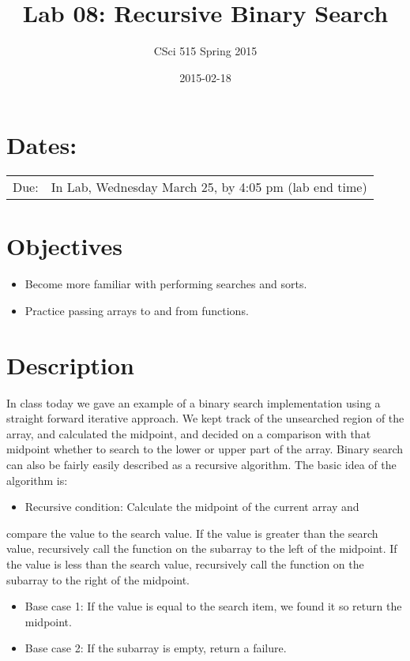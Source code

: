 \documentclass[11pt]{article}
\title{Lab 08: Recursive Binary Search}
\author{CSci 515 Spring 2015}
\date{2015-02-18}
\begin{document}
\maketitle


\section*{Dates:}
\label{sec-1}


\begin{center}
\begin{tabular}{ll}
 Due:  &  In Lab, Wednesday March 25, by 4:05 pm (lab end time)  \\
\end{tabular}
\end{center}
\section*{Objectives}
\label{sec-2}

\begin{itemize}
\item Become more familiar with performing searches and sorts.
\item Practice passing arrays to and from functions.
\end{itemize}
\section*{Description}
\label{sec-3}

In class today we gave an example of a binary search implementation
using a straight forward iterative approach.  We kept track of the
unsearched region of the array, and calculated the midpoint, and
decided on a comparison with that midpoint whether to search to the
lower or upper part of the array.  Binary search can also be fairly
easily described as a recursive algorithm.  The basic idea of the
algorithm is:

\begin{itemize}
\item Recursive condition: Calculate the midpoint of the current array and
\end{itemize}
compare the value to the search value.  If the value is greater than
the search value, recursively call the function on the subarray
to the left of the midpoint.  If the value is less than the search
value, recursively call the function on the subarray to the right of the
midpoint.
\begin{itemize}
\item Base case 1: If the value is equal to the search item, we found it
  so return the midpoint.
\item Base case 2: If the subarray is empty, return a failure.
\end{itemize}
\end{document}
